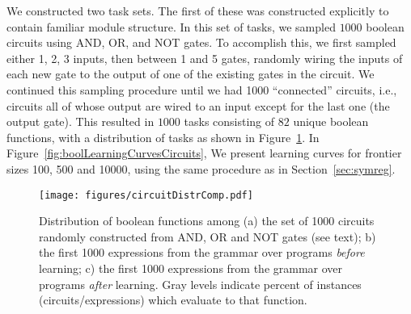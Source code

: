 \documentclass{article}
\begin{document}



We constructed two task sets. The first of these was constructed
explicitly to contain familiar module structure. In this set of tasks,
we sampled $1000$ boolean circuits using AND, OR, and NOT gates. To
accomplish this, we first sampled either 1, 2, 3 inputs, then between
1 and 5 gates, randomly wiring the inputs of each new gate to the
output of one of the existing gates in the circuit. We continued this
sampling procedure until we had 1000 ``connected'' circuits, i.e.,
circuits all of whose output are wired to an input except for the last
one (the output gate). This resulted in $1000$ tasks consisting of
$82$ unique boolean functions, with a distribution of tasks as shown
in Figure~\ref{fig:booldistr}. In Figure~\ref{fig:boolLearningCurvesCircuits},
We present learning curves for frontier sizes 100, 500 and 10000,
using the same procedure as in Section~\ref{sec:symreg}. 


\begin{figure}
\texttt{[image: figures/circuitDistrComp.pdf]}
\vspace{-10pt}
\caption{Distribution of boolean functions among (a) the set of 1000
  circuits randomly constructed from AND, OR and NOT gates (see text);
  b) the first 1000 expressions from the grammar over programs
  \emph{before} learning; c) the first 1000 expressions from the
  grammar over programs \emph{after} learning. Gray levels indicate
  percent of instances (circuits/expressions) which evaluate to that
  function.\label{fig:booldistr}}
\end{figure}
\end{document}
